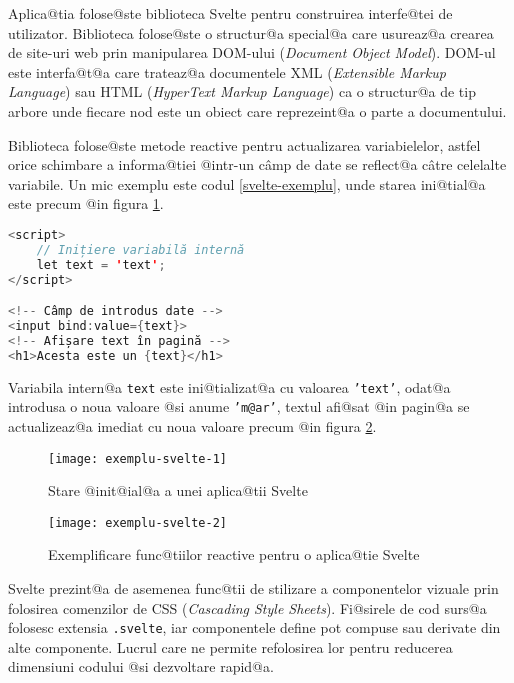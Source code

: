 Aplica@tia folose@ste biblioteca Svelte pentru construirea interfe@tei de utilizator. Biblioteca folose@ste o structur@a special@a care usureaz@a crearea de site-uri web prin manipularea DOM-ului (\textsl{Document Object Model}). DOM-ul este interfa@t@a care trateaz@a documentele XML (\textsl{Extensible Markup Language}) sau HTML (\textsl{HyperText Markup Language}) ca o structur@a de tip arbore unde fiecare nod este un obiect care reprezeint@a o parte a documentului.

Biblioteca folose@ste metode reactive pentru actualizarea variabielelor, astfel orice schimbare a informa@tiei @intr-un c\^ amp de date se reflect@a c\^ atre celelalte variabile. Un mic exemplu este codul \ref{svelte-exemplu}, unde starea ini@tial@a este precum @in figura \ref{fig:exemplu-svelte-1}.

\begin{lstlisting}[language=Java, caption={Exemplu de utilizare a bibliotecii Svelte}, label={svelte-exemplu}]
<script>
	// Inițiere variabilă internă
	let text = 'text'; 
</script>

<!-- Câmp de introdus date -->
<input bind:value={text}>
<!-- Afișare text în pagină -->
<h1>Acesta este un {text}</h1>
\end{lstlisting}

Variabila intern@a \texttt{text} este ini@tializat@a cu valoarea \texttt{'text'}, odat@a introdusa o noua valoare @si anume \texttt{'m@ar'}, textul afi@sat @in pagin@a se actualizeaz@a imediat cu noua valoare precum @in figura \ref{fig:exemplu-svelte-2}. 

\begin{figure}[h]
	\centering
	\texttt{[image: exemplu-svelte-1]}
	\caption{Stare @init@ial@a a unei aplica@tii Svelte}
	\label{fig:exemplu-svelte-1}
\end{figure}

\begin{figure}[h]
	\centering
	\texttt{[image: exemplu-svelte-2]}
	\caption{Exemplificare func@tiilor reactive pentru o aplica@tie Svelte}
	\label{fig:exemplu-svelte-2}
\end{figure}

Svelte prezint@a de asemenea func@tii de stilizare a componentelor vizuale prin folosirea comenzilor de CSS (\textsl{Cascading Style Sheets}). Fi@sirele de cod surs@a folosesc extensia \texttt{.svelte}, iar componentele define pot compuse sau derivate din alte componente. Lucrul care ne permite refolosirea lor pentru reducerea dimensiuni codului @si dezvoltare rapid@a.

